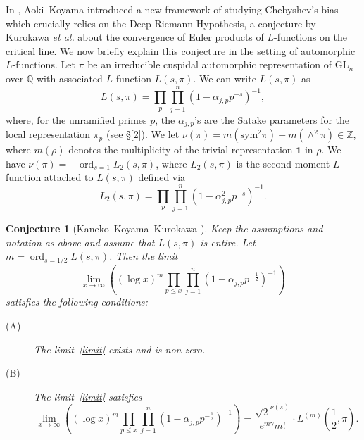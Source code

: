 \documentclass[12pt,reqno]{amsart}
\newtheorem{conjecture}[theorem]{Conjecture}
\theoremstyle{definition}
\numberwithin{equation}{section}
\newcommand{\Z}{\mathbb{Z}}
\newcommand{\ord}{\mathop{\mathrm{ord}}}
\begin{document}
In \cite{AokiKoyama2023}, Aoki--Koyama introduced a new framework of studying Chebyshev's bias which crucially relies on the Deep Riemann Hypothesis, a conjecture by Kurokawa \textit{et al.} about the convergence of Euler products of $L$-functions on the critical line.
We now briefly explain this conjecture in the setting of automorphic $L$-functions. Let $\pi$ be an irreducible cuspidal automorphic representation of $\mathrm{GL}_n$ over $\mathbb{Q}$ with associated $L$-function $L(s, \pi)$. We can write $L(s, \pi)$ as 
$$
L(s, \pi)=\prod_p \prod_{j=1}^n (1-\alpha_{j, p}p^{-s})^{-1},  
$$
where, for the unramified primes $p$, the $\alpha_{j, p}$'s are the Satake parameters for the local representation $\pi_p$ (see \S \ref{2}).  We let  $\nu(\pi) = m(\mathrm{sym}^{2} \pi)-m(\wedge^{2} \pi) \in \Z$,  where $m(\rho)$ denotes the multiplicity of the trivial representation $\textbf{1}$ in $\rho$.  %
We have $\nu(\pi)=-\ord_{s=1} L_2(s, \pi)$, where $L_2(s, \pi)$ is the second moment $L$-function attached to $L(s, \pi)$ defined via 
\begin{equation} \label{sm}
L_2(s, \pi)=\prod_p  \prod_{j=1}^n (1-\alpha_{j, p}^2 p^{-s})^{-1}. 
\end{equation}

\begin{conjecture}[Kaneko--Koyama--Kurokawa \cite{KanekoKoyamaKurokawa2022}]\label{DRH}
Keep the assumptions and notation as above and assume that $L(s, \pi)$ is entire. Let $m = \ord_{s = 1/2} L(s, \pi)$. Then the limit
\begin{equation}\label{limit}
\lim_{x \to \infty} \left((\log x)^{m} \prod_{p \leq x} \prod_{j=1}^n \left(1-\alpha_{j, p} p^{-\frac{1}{2}} \right)^{-1} \right)
\end{equation}
satisfies the following conditions:
\begin{description}
\item[(A)] The limit~\eqref{limit} exists and is non-zero.
\item[(B)] The limit~\eqref{limit} satisfies
\begin{equation*}
\lim_{x \to \infty} \left((\log x)^{m} \prod_{p \leq x} \prod_{j=1}^n \left(1-\alpha_{j, p} p^{-\frac{1}{2}} \right)^{-1} \right)
 = \frac{\sqrt{2}^{ \nu (\pi) }}{e^{m \gamma} m!} \cdot L^{(m)} \left(\frac{1}{2}, \pi \right).
\end{equation*}
\end{description}
\end{conjecture}
\end{document}

